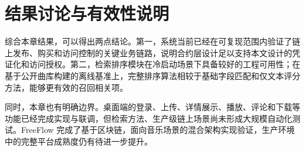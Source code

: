 \section{结果讨论与有效性说明}

综合本章结果，可以得出两点结论。第一，系统当前已经在可复现范围内验证了链上发布、购买和访问控制的关键业务链路，说明合约层设计足以支持本文设计的凭证化和访问授权。第二，检索排序模块在冷启动场景下具备较好的工程可用性；在基于公开曲库构建的离线基准上，完整排序算法相较于基础字段匹配和仅文本评分方法，能够更有效的召回相关项。

同时，本章也有明确边界。桌面端的登录、上传、详情展示、播放、评论和下载等功能已经完成实现与联调，但检索方法、生产级链上场景尚未形成大规模自动化测试。FreeFlow 完成了基于区块链，面向音乐场景的混合架构实现验证，生产环境中的完整平台成熟度仍有待进一步提升。
